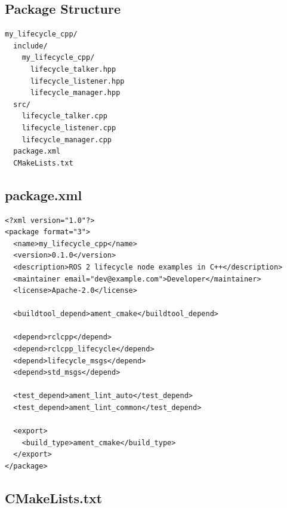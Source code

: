 \documentclass[11pt,a4paper]{csarticle}
\begin{document}
\subsection{Package Structure}

\begin{lstlisting}[style=bash,caption={C++ package layout}]
my_lifecycle_cpp/
  include/
    my_lifecycle_cpp/
      lifecycle_talker.hpp
      lifecycle_listener.hpp
      lifecycle_manager.hpp
  src/
    lifecycle_talker.cpp
    lifecycle_listener.cpp
    lifecycle_manager.cpp
  package.xml
  CMakeLists.txt
\end{lstlisting}

\subsection{package.xml}

\begin{lstlisting}[style=xml,caption={package.xml for the C++ package}]
<?xml version="1.0"?>
<package format="3">
  <name>my_lifecycle_cpp</name>
  <version>0.1.0</version>
  <description>ROS 2 lifecycle node examples in C++</description>
  <maintainer email="dev@example.com">Developer</maintainer>
  <license>Apache-2.0</license>

  <buildtool_depend>ament_cmake</buildtool_depend>

  <depend>rclcpp</depend>
  <depend>rclcpp_lifecycle</depend>
  <depend>lifecycle_msgs</depend>
  <depend>std_msgs</depend>

  <test_depend>ament_lint_auto</test_depend>
  <test_depend>ament_lint_common</test_depend>

  <export>
    <build_type>ament_cmake</build_type>
  </export>
</package>
\end{lstlisting}

\subsection{CMakeLists.txt}
\end{document}
